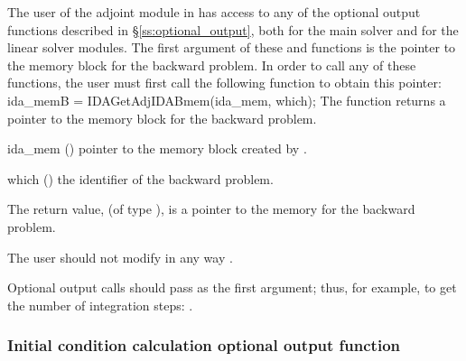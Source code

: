 The user of the adjoint module in {\idas} has access to any of the
optional output functions described in \S\ref{ss:optional_output},
both for the main solver and for the linear solver modules. The first
argument of these  and  functions is the
pointer to the {\idas} memory block for the backward problem. In order
to call any of these functions, the user must first call the following
function to obtain this pointer:
{
  ida\_memB = IDAGetAdjIDABmem(ida\_mem, which);
}
{
  The function  returns a pointer to the {\idas}
  memory block for the backward problem.
}
{
  \begin{args}
  \item[ida\_mem] ()
    pointer to the {\idas} memory block created by .
  \item[which] ()
    the identifier of the backward problem.
  \end{args}
}
{
  The return value,  (of type ), is a pointer to the
  {\idas} memory for the backward problem.
}
{
  {\warn}The user should not modify in any way .

  Optional output calls should pass  as the first argument;
  thus, for example, to get the number of integration steps:
  .
}


\subsubsection{Initial condition calculation optional output function}
\label{sss:optout_iccalcB}


